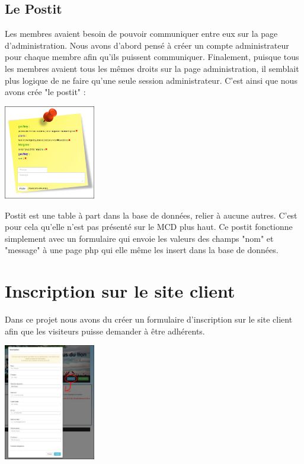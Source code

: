 \documentclass[11pt,a4paper,titlepage]{report}
\begin{document}
\subsection{Le Postit}
Les membres avaient besoin de pouvoir communiquer entre eux sur la page d'administration. Nous avons d'abord pensé à créer un compte administrateur pour chaque membre afin qu'ils puissent communiquer. Finalement, puisque tous les membres avaient tous les mêmes droits sur la page administration, il semblait plus logique de ne faire qu'une seule session administrateur. C'est ainsi que nous avons crée "le postit" :   
\begin{center}
\includegraphics[width=0.3\textwidth]{postit.jpg}~
\end{center}

Postit est une table à part dans la base de données, relier à aucune autres. C'est pour cela qu'elle n'est pas présenté sur le MCD plus haut.
Ce postit fonctionne simplement avec un formulaire qui envoie les valeurs des champs "nom" et "message" à une page php qui elle même les insert dans la base de données. 

\section{Inscription sur le site client}
Dans ce projet nous avons du créer un formulaire d'inscription sur le site client afin que les visiteurs puisse demander à être adhérents. 

\begin{center}
\includegraphics[width=0.3\textwidth]{inscr.jpg}~
\end{center}
\end{document}
